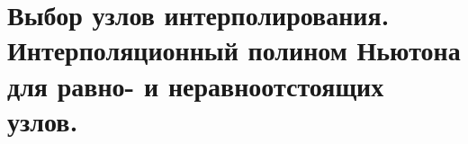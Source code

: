 \documentclass[../../calc-math-exam-2023.tex]{subfiles}
\begin{document}
    \section{Выбор узлов интерполирования. Интерполяционный полином Ньютона для равно- и неравноотстоящих узлов.}\label{sec:ch07}
\end{document}
